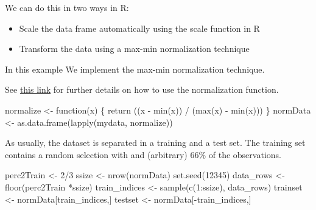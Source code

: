 \documentclass[
  letterpaper,
  DIV=11,
  numbers=noendperiod,
  oneside]{scrartcl}
\newenvironment{Shaded}{\begin{snugshade}}{\end{snugshade}}
\newcommand{\ControlFlowTok}[1]{\textcolor[rgb]{0.00,0.23,0.31}{#1}}
\newcommand{\DecValTok}[1]{\textcolor[rgb]{0.68,0.00,0.00}{#1}}
\newcommand{\FunctionTok}[1]{\textcolor[rgb]{0.28,0.35,0.67}{#1}}
\newcommand{\NormalTok}[1]{\textcolor[rgb]{0.00,0.23,0.31}{#1}}
\newcommand{\OtherTok}[1]{\textcolor[rgb]{0.00,0.23,0.31}{#1}}
\newcommand{\SpecialCharTok}[1]{\textcolor[rgb]{0.37,0.37,0.37}{#1}}
\providecommand{\tightlist}{%
  \setlength{\itemsep}{0pt}\setlength{\parskip}{0pt}}\usepackage{longtable,booktabs,array}
\begin{document}
We can do this in two ways in R:

\begin{itemize}
\tightlist
\item
  Scale the data frame automatically using the scale function in R
\item
  Transform the data using a max-min normalization technique
\end{itemize}

In this example We implement the max-min normalization technique.

See
\href{https://vitalflux.com/data-science-scale-normalize-numeric-data-using-r/}{this
link} for further details on how to use the normalization function.

\begin{Shaded}
\begin{Highlighting}[]
\NormalTok{normalize }\OtherTok{\textless{}{-}} \ControlFlowTok{function}\NormalTok{(x) \{}
  \FunctionTok{return}\NormalTok{ ((x }\SpecialCharTok{{-}} \FunctionTok{min}\NormalTok{(x)) }\SpecialCharTok{/}\NormalTok{ (}\FunctionTok{max}\NormalTok{(x) }\SpecialCharTok{{-}} \FunctionTok{min}\NormalTok{(x)))}
\NormalTok{\}}
\NormalTok{normData }\OtherTok{\textless{}{-}} \FunctionTok{as.data.frame}\NormalTok{(}\FunctionTok{lapply}\NormalTok{(mydata, normalize))}
\end{Highlighting}
\end{Shaded}

As usually, the dataset is separated in a training and a test set. The
training set contains a random selection with and (arbitrary) 66\% of
the observations.

\begin{Shaded}
\begin{Highlighting}[]
\NormalTok{perc2Train }\OtherTok{\textless{}{-}} \DecValTok{2}\SpecialCharTok{/}\DecValTok{3}
\NormalTok{ssize }\OtherTok{\textless{}{-}} \FunctionTok{nrow}\NormalTok{(normData)}
\FunctionTok{set.seed}\NormalTok{(}\DecValTok{12345}\NormalTok{)}
\NormalTok{data\_rows }\OtherTok{\textless{}{-}} \FunctionTok{floor}\NormalTok{(perc2Train }\SpecialCharTok{*}\NormalTok{ssize)}
\NormalTok{train\_indices }\OtherTok{\textless{}{-}} \FunctionTok{sample}\NormalTok{(}\FunctionTok{c}\NormalTok{(}\DecValTok{1}\SpecialCharTok{:}\NormalTok{ssize), data\_rows)}
\NormalTok{trainset }\OtherTok{\textless{}{-}}\NormalTok{ normData[train\_indices,]}
\NormalTok{testset }\OtherTok{\textless{}{-}}\NormalTok{ normData[}\SpecialCharTok{{-}}\NormalTok{train\_indices,]}
\end{Highlighting}
\end{Shaded}
\end{document}
